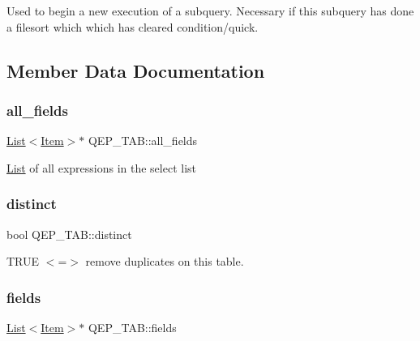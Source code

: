 Used to begin a new execution of a subquery. Necessary if this subquery has done a filesort which which has cleared condition/quick. 

\subsection{Member Data Documentation}
\mbox{\label{classQEP__TAB_a0707d5142158b844cbc095219f5d29cf}} 
\subsubsection{\texorpdfstring{all\+\_\+fields}{all\_fields}}
{\footnotesize\ttfamily \mbox{\hyperlink{classList}{List}}$<$\mbox{\hyperlink{classItem}{Item}}$>$$\ast$ Q\+E\+P\+\_\+\+T\+A\+B\+::all\+\_\+fields}

\mbox{\hyperlink{classList}{List}} of all expressions in the select list \mbox{\label{classQEP__TAB_a856c37d7d3dc2bb077ea27af9bb77b94}} 
\subsubsection{\texorpdfstring{distinct}{distinct}}
{\footnotesize\ttfamily bool Q\+E\+P\+\_\+\+T\+A\+B\+::distinct}

T\+R\+UE $<$=$>$ remove duplicates on this table. \mbox{\label{classQEP__TAB_ac8d037d951812d2fb5a0705e467eafe3}} 
\subsubsection{\texorpdfstring{fields}{fields}}
{\footnotesize\ttfamily \mbox{\hyperlink{classList}{List}}$<$\mbox{\hyperlink{classItem}{Item}}$>$$\ast$ Q\+E\+P\+\_\+\+T\+A\+B\+::fields}

